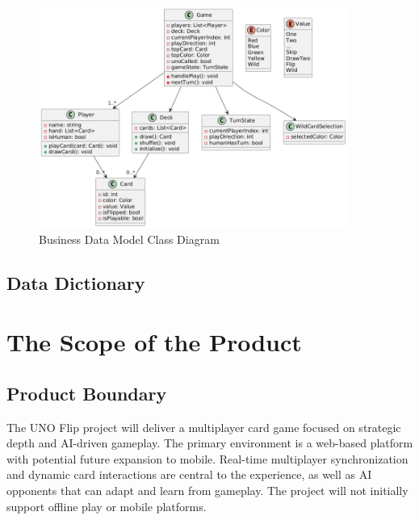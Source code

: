 \documentclass[12pt]{article}
\begin{document}
\begin{figure}[H]
    \centering
    \includegraphics[width=0.9\textwidth]{business_model.png}
    \caption{Business Data Model Class Diagram}
    \label{fig:business-data-model}
\end{figure}

\subsection{Data Dictionary}


\section{The Scope of the Product}

\subsection{Product Boundary}
The UNO Flip project will deliver a multiplayer card game focused on strategic depth and AI-driven gameplay. The primary environment is a web-based platform with potential future expansion to mobile. Real-time multiplayer synchronization and dynamic card interactions are central to the experience, as well as AI opponents that can adapt and learn from gameplay. The project will not initially support offline play or mobile platforms.
\end{document}
